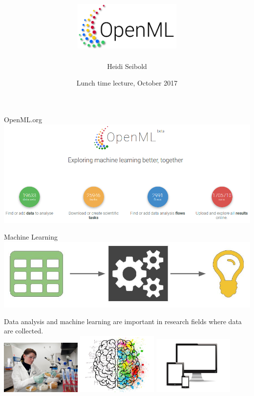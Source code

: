 \documentclass{beamer}
\author{Heidi Seibold}
\title{\includegraphics[width=0.4\textwidth]{OpenMLLogo}}
\date{Lunch time lecture, October 2017}
\begin{document}
\thispagestyle{empty}
\begin{frame}
\transsplithorizontalout
\titlepage
\end{frame}

\begin{frame}[fragile]{OpenML.org}
\includegraphics[width = \textwidth]{screenshot}
\end{frame}

\begin{frame}[fragile]{Machine Learning}
\includegraphics[width = \textwidth]{ML}
\end{frame}

\begin{frame}[fragile]{}
\large 
\begin{center}
Data analysis and machine learning are important in research 
fields where data are collected.\\[2em]

\includegraphics[width = 0.3\textwidth]{lab}
\includegraphics[width = 0.3\textwidth]{psy}
\includegraphics[width = 0.3\textwidth]{wifi}
\end{center}
\end{frame}
\end{document}
